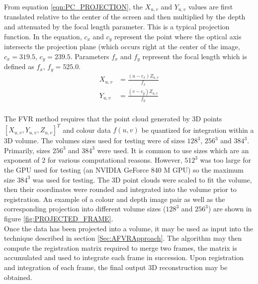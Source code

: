 From equation \ref{eqn:PC_PROJECTION}, the $X_{u,v}$ and $Y_{u,v}$ values are first translated relative to the center of the screen and then multiplied by the depth and attenuated by the focal length parameter. This is a typical projection function. In the equation, $c_x$ and $c_y$ represent the point where the optical axis intersects the projection plane (which occurs right at the center of the image, $c_x = 319.5$, $c_y = 239.5$. Parameters $f_x$ and $f_y$ represent the focal length which is defined as $f_x$, $f_y = 525.0$. \\


\begin{equation} \label{eqn:PC_PROJECTION}
\begin{split}
X_{u,v} & = \frac{(u - c_x)Z_{u,v}}{f_x} \\
Y_{u,v} & = \frac{(v - c_y)Z_{u,v}}{f_y} \\
\end{split}
\end{equation}

The FVR method requires that the point cloud generated by 3D points $[X_{u,v}, Y_{u,v}, Z_{u,v}]^T$ and colour data $f(u,v)$ be quantized for integration within a 3D volume. The volumes sizes used for testing were of sizes $128^3$, $256^3$ and $384^3$. Primarily, sizes $256^3$ and $384^3$ were used. It is common to use sizes which are an exponent of 2 for various computational reasons. However, $512^3$ was too large for the GPU used for testing (an NVIDIA GeForce 840 M GPU) so the maximum size $384^3$ was used for testing. The 3D point clouds were scaled to fit the volume, then their coordinates were rounded and integrated into the volume prior to registration. An example of a colour and depth image pair as well as the corresponding projection into different volume sizes ($128^3$ and $256^3$) are shown in figure \ref{fig:PROJECTED_FRAME}.  \\

Once the data has been projected into a volume, it may be used as input into the technique described in section \ref{Sec:AFVRApproach}. The algorithm may then compute the registration matrix required to merge two frames, the matrix is accumulated and used to integrate each frame in succession. Upon registration and integration of each frame, the final output 3D reconstruction may be obtained. \\

